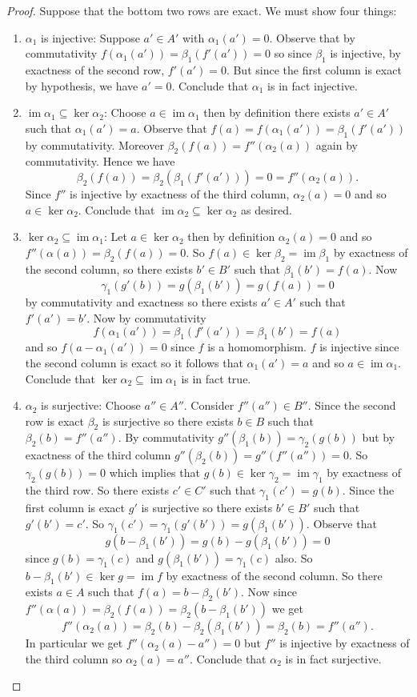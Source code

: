 \documentclass[8pt]{amsart}
\theoremstyle{plain}%
\theoremstyle{definition}
\theoremstyle{remark}
\numberwithin{equation}{section}
\newcommand{\im}{\operatorname{im}}
\begin{document}
	\begin{proof}
		Suppose that the bottom two rows are exact. We must show four things:
		\begin{enumerate}
			\item $\alpha_1$ is injective: Suppose $a' \in A'$ with $\alpha_1(a') = 0$. Observe that by commutativity $f(\alpha_1(a')) = \beta_1(f'(a')) = 0$ so since $\beta_1$ is injective, by exactness of the second row, $f'(a') = 0$. But since the first column is exact by hypothesis, we have $a' = 0$. Conclude that $\alpha_1$ is in fact injective.
			\item $\im \alpha_1 \subseteq \ker \alpha_2$: Choose $a \in \im \alpha_1$ then by definition there exists $a' \in A'$ such that $\alpha_1(a') = a$. Observe that $f(a) = f(\alpha_1(a')) = \beta_1(f'(a'))$ by commutativity. Moreover $\beta_2(f(a)) = f''(\alpha_2(a))$ again by commutativity. Hence we have $$\beta_2(f(a)) = \beta_2(\beta_1(f'(a'))) = 0 = f''(\alpha_2(a)).$$ Since $f''$ is injective by exactness of the third column, $\alpha_2(a) = 0$ and so $a \in \ker \alpha_2$. Conclude that $\im \alpha_2 \subseteq \ker \alpha_2$ as desired.
			\item $\ker \alpha_2 \subseteq \im \alpha_1$: Let $a \in \ker \alpha_2$ then by definition $\alpha_2(a) = 0$ and so $f''(\alpha(a)) = \beta_2(f(a)) = 0$. So $f(a) \in \ker \beta_2 = \im \beta_1$ by exactness of the second column, so there exists $b' \in B'$ such that $\beta_1(b') = f(a)$. Now $$\gamma_1(g'(b)) = g(\beta_1(b')) = g(f(a)) = 0$$ by commutativity and exactness so there exists $a' \in A'$ such that $f'(a') = b'$. Now by commutativity $$f(\alpha_1(a')) = \beta_1(f'(a')) = \beta_1(b') = f(a)$$ and so $f(a - \alpha_1(a')) = 0$ since $f$ is a homomorphism. $f$ is injective since the second column is exact so it follows that $\alpha_1(a') = a$ and so $a \in \im \alpha_1$. Conclude that $\ker \alpha_2 \subseteq \im \alpha_1$ is in fact true.
			\item $\alpha_2$ is surjective: Choose $a'' \in A''$. Consider $f''(a'') \in B''$. Since the second row is exact $\beta_2$ is surjective so there exists $b \in B$ such that $\beta_2(b) = f''(a'')$. By commutativity $g''(\beta_1(b)) = \gamma_2(g(b))$ but by exactness of the third column $g''(\beta_2(b)) = g''(f''(a'')) = 0$. So $\gamma_2(g(b)) = 0$ which implies that $g(b) \in \ker \gamma_2 = \im \gamma_1$ by exactness of the third row. So there exists $c' \in C'$ such that $\gamma_1(c') = g(b)$. Since the first column is exact $g'$ is surjective so there exists $b' \in B'$ such that $g'(b') = c'$. So $\gamma_1(c') = \gamma_1(g'(b')) = g(\beta_1(b'))$. Observe that $$g(b - \beta_1(b')) = g(b) - g(\beta_1(b')) = 0$$ since $g(b) = \gamma_1(c)$ and $g(\beta_1(b')) = \gamma_1(c)$ also. So $b - \beta_1(b') \in \ker g = \im f$ by exactness of the second column. So there exists $a \in A$ such that $f(a) = b - \beta_2(b')$. Now since $f''(\alpha(a)) = \beta_2(f(a)) = \beta_2(b - \beta_1(b'))$ we get $$f''(\alpha_2(a)) = \beta_2(b) - \beta_2(\beta_1(b')) = \beta_2(b) = f''(a'').$$ In particular we get $f''(\alpha_2(a) - a'') = 0$ but $f''$ is injective by exactness of the third column so $\alpha_2(a) = a''$. Conclude that $\alpha_2$ is in fact surjective.

\end{enumerate}
\end{proof}
\end{document}
